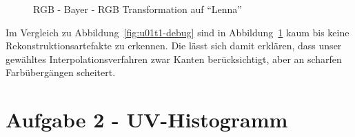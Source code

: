 \begin{figure}[htpb]
\begin{center}
\end{center}
\caption{RGB - Bayer - RGB Transformation auf ``Lenna''}
\label{fig:u01t1-lenna}
\end{figure}

Im Vergleich zu Abbildung~\ref{fig:u01t1-debug} sind in Abbildung~\ref{fig:u01t1-lenna} 
kaum bis keine Rekonstruktionsartefakte zu erkennen. Die l\"asst sich damit erkl\"aren,
dass unser gew\"ahltes Interpolationsverfahren zwar Kanten ber\"ucksichtigt, aber an
scharfen Farb\"uberg\"angen scheitert.

\section*{Aufgabe 2 - UV-Histogramm} 

